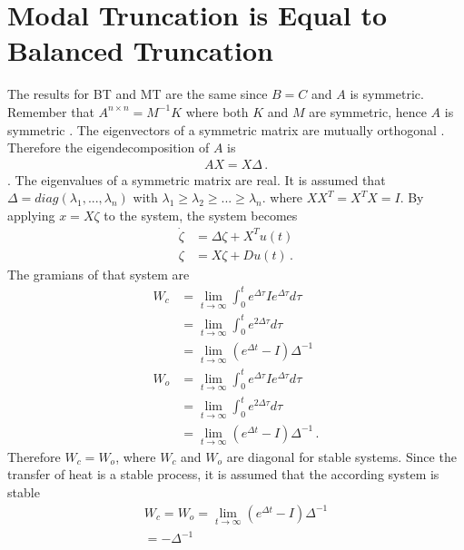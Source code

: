\section{Modal Truncation is Equal to Balanced Truncation}
The results for BT and MT are the same since \(B = C\) and \(A\) is symmetric.
Remember that \(A^{n\times n} = M^{-1}K\) where both \(K\) and \(M\) are symmetric, hence \(A\) is symmetric \cite{170372}.
The eigenvectors of a symmetric matrix are mutually orthogonal \cite{Zhang}.
Therefore the eigendecomposition of  \(A\) is
\begin{gather}
AX = X\Delta \,.
\end{gather}.
The eigenvalues of a symmetric matrix are real.
It is assumed that \(\Delta = diag(\lambda_1, ..., \lambda_n)\) with \(\lambda_1 \geq \lambda_2 \geq ... \geq \lambda_n\).
where \(XX^T = X^TX = I\).
By applying \(x = X\zeta\) to the system, the system becomes
\begin{align}
\dot{\zeta} &= \Delta \zeta + X^{T}u(t) \label{sys-zeta1}\\
\zeta &= X\zeta + Du(t) \,. \label{sys-zeta2}
\end{align}
The gramians of that system are
\begin{align}
W_c &= \lim_{t \to \infty} \int_{0}^{t} e^{\Delta\tau}Ie^{\Delta\tau}d\tau \label{gramc} \\
&= \lim_{t \to \infty} \int_{0}^{t} e^{2\Delta\tau}d\tau \\
&= \lim_{t \to \infty} (e^{\Delta t} - I)\Delta^{-1} \\
W_o &= \lim_{t \to \infty} \int_{0}^{t} e^{\Delta\tau}Ie^{\Delta\tau}d\tau \label{gramo} \\
&= \lim_{t \to \infty} \int_{0}^{t} e^{2\Delta\tau}d\tau \\
&= \lim_{t \to \infty} (e^{\Delta t} - I)\Delta^{-1} \,.
\end{align}
Therefore \(W_c = W_o\), where \(W_c\) and \(W_o\) are diagonal for stable systems.
Since the transfer of heat is a stable process, it is assumed that the according system is stable \cite{658289}
\begin{gather}
W_c = W_o = \lim_{t \to \infty} (e^{\Delta t} - I)\Delta^{-1} \\
= -\Delta^{-1} 
\end{gather}


